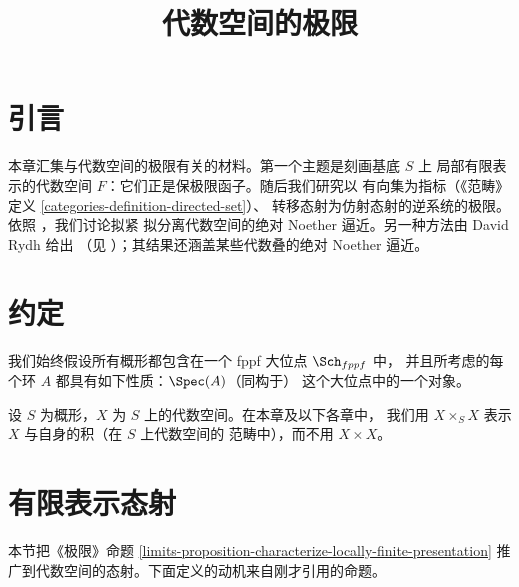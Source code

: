

%


\title{代数空间的极限}


\maketitle

\label{section-phantom}

\tableofcontents

\section{引言}
\label{section-introduction}

\noindent
本章汇集与代数空间的极限有关的材料。第一个主题是刻画基底 $S$ 上
局部有限表示的代数空间 $F$：它们正是保极限函子。随后我们研究以
有向集为指标（《范畴》定义 \ref{categories-definition-directed-set}）、
转移态射为仿射态射的逆系统的极限。依照 \cite{CLO}，我们讨论拟紧
拟分离代数空间的绝对 Noether 逼近。另一种方法由 David Rydh 给出
（见 \cite{rydh_approx}）；其结果还涵盖某些代数叠的绝对 Noether 逼近。


\section{约定}
\label{section-conventions}

\noindent
我们始终假设所有概形都包含在一个 fppf 大位点 $\Sch_{fppf}$ 中，
并且所考虑的每个环 $A$ 都具有如下性质：$\Spec(A)$（同构于）
这个大位点中的一个对象。

\medskip\noindent
设 $S$ 为概形，$X$ 为 $S$ 上的代数空间。在本章及以下各章中，
我们用 $X \times_S X$ 表示 $X$ 与自身的积（在 $S$ 上代数空间的
范畴中），而不用 $X \times X$。











\section{有限表示态射}
\label{section-finite-presentation}

\noindent
本节把《极限》命题
\ref{limits-proposition-characterize-locally-finite-presentation}
推广到代数空间的态射。下面定义的动机来自刚才引用的命题。

